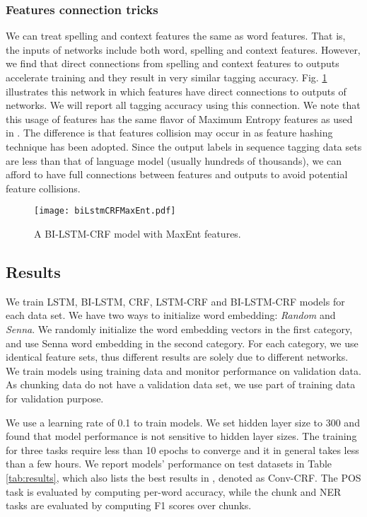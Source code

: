 \documentclass[11pt,a4paper]{article}
\begin{document}
\subsubsection{Features connection tricks}
We can treat spelling and context features the same as word features. That is, the inputs of networks include both word, spelling and context features. However, we find that direct connections from spelling and context features to outputs accelerate training and they result in very similar tagging accuracy. Fig. \ref{fig:biLstmCRFMaxEnt} illustrates this network in which features have direct connections to outputs of networks. We will report all tagging accuracy using this connection. We note that this usage of features has the same flavor of Maximum Entropy features as used in \cite{mikolov2}. The difference is that features collision may occur in \cite{mikolov2} as feature hashing technique has been adopted. Since the output labels in sequence tagging data sets are less than that of language model (usually hundreds of thousands), we can afford to have full connections between features and outputs to avoid  potential feature collisions.
\begin{figure}[!htb]
	\centering
		\texttt{[image: biLstmCRFMaxEnt.pdf]}
	\caption{A BI-LSTM-CRF model with MaxEnt features.}
	\label{fig:biLstmCRFMaxEnt}
\end{figure} 

\subsection{Results}
We train LSTM, BI-LSTM, CRF, LSTM-CRF and BI-LSTM-CRF models for each data set. We have two ways to initialize word embedding: \textit{Random} and \textit{Senna}. We randomly initialize the word embedding vectors in the first category, and use Senna word embedding in the second category. For each category, we use identical feature sets,  thus different results are solely due to different networks. We train models using training data and monitor performance on validation data. As chunking data do not have a validation data set, we use part of  training data for validation purpose.  

We use a learning rate of 0.1 to train models. We set hidden layer size to 300 and found that model performance is not sensitive to hidden layer sizes. The training for three tasks require less than 10 epochs to converge and it in general takes less than a few hours. We report models' performance on  test datasets in Table \ref{tab:results}, which also lists the best results in \cite{collobert1}, denoted as Conv-CRF. The POS task is evaluated by computing per-word accuracy, while the chunk and NER tasks are evaluated by computing F1 scores over chunks. 
\end{document}
